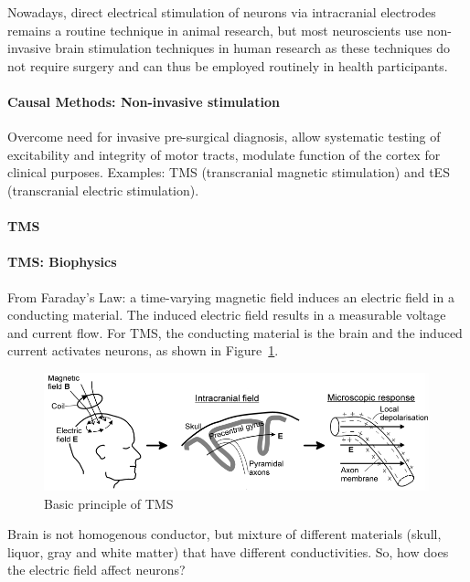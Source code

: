 \documentclass[12pt,article,oneside,a4paper]{memoir}
\begin{document}
Nowadays, direct electrical stimulation of neurons via intracranial electrodes
remains a routine technique in animal research, but most neuroscients use
non-invasive brain stimulation techniques in human research as these techniques
do not require surgery and can thus be employed routinely in health participants.

\paragraph{Causal Methods: Non-invasive stimulation}
Overcome need for invasive pre-surgical diagnosis, allow systematic testing of
excitability and integrity of motor tracts, modulate function of the cortex for
clinical purposes. Examples: TMS (transcranial magnetic stimulation) and tES
(transcranial electric stimulation).

\paragraph{TMS}

\paragraph{TMS: Biophysics}
From Faraday's Law: a time-varying magnetic field induces an electric field in a
conducting material. The induced electric field results in a measurable voltage and
current flow. For TMS, the conducting material is the brain and the induced current
activates neurons, as shown in Figure~\ref{fig:tms}.

\begin{figure}
  \centering
  \includegraphics[width=\textwidth]{imgs/tms.png}
  \caption{Basic principle of TMS}
  \label{fig:tms}
\end{figure}

Brain is not homogenous conductor, but mixture of different materials (skull, liquor,
gray and white matter) that have different conductivities. So, how does the electric
field affect neurons?
\end{document}
